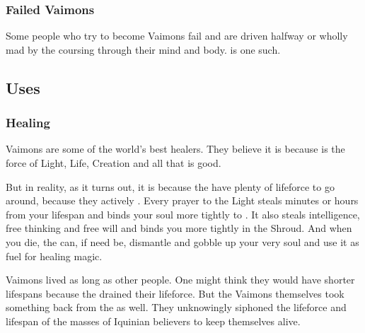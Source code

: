 




\subsubsection{Failed Vaimons}
Some people who try to become Vaimons fail and are driven halfway or wholly mad by the \Archons{} coursing through their mind and body. 
 is one such. 









\subsection{Uses}





\subsubsection{Healing}
 Vaimons are some of the world's best healers. They believe it is because  is the force of Light, Life, Creation and all that is good. 

But in reality, as it turns out, it is because the \sephiroth{} have plenty of lifeforce to go around, because they actively . 
Every prayer to the Light steals minutes or hours from your lifespan and binds your soul more tightly to \iquin{}. 
It also steals intelligence, free thinking and free will and binds you more tightly in the Shroud. 
And when you die, the \sephiroth{} can, if need be, dismantle and gobble up your very soul and use it as fuel for healing magic. 

Vaimons lived as long as other people.
One might think they would have shorter lifespans because the \sephiroth drained their lifeforce. 
But the Vaimons themselves took something back from the \sephiroth as well. 
They unknowingly siphoned the lifeforce and lifespan of the masses of Iquinian believers to keep themselves alive. 









